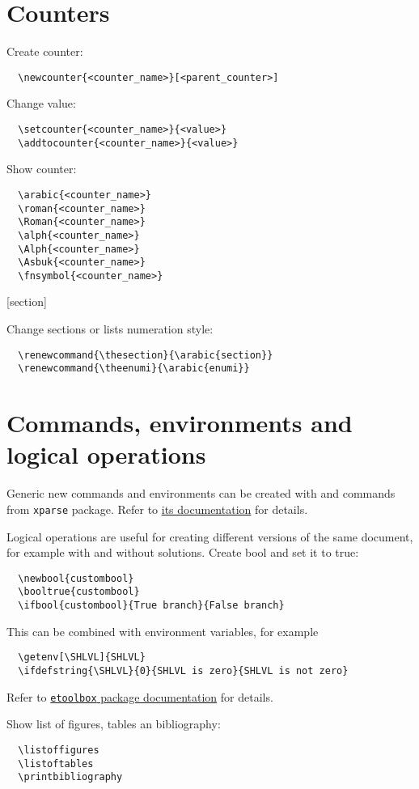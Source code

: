 \section{Counters}
Create counter:
\begin{verbatim}
  \newcounter{<counter_name>}[<parent_counter>]
\end{verbatim}
Change value:
\begin{verbatim}
  \setcounter{<counter_name>}{<value>}
  \addtocounter{<counter_name>}{<value>}
\end{verbatim}
Show counter:
\begin{verbatim}
  \arabic{<counter_name>}
  \roman{<counter_name>}
  \Roman{<counter_name>}
  \alph{<counter_name>}
  \Alph{<counter_name>}
  \Asbuk{<counter_name>}
  \fnsymbol{<counter_name>}
\end{verbatim}

[section]
\setcounter{customcounter}{1}
\begin{mdframed}[style=example]
\end{mdframed}

Change sections or lists numeration style:
\begin{verbatim}
  \renewcommand{\thesection}{\arabic{section}}
  \renewcommand{\theenumi}{\arabic{enumi}}
\end{verbatim}

\section{Commands, environments and logical operations}
Generic new commands and environments can be created with \texttt{\NewDocumentCommand} and \texttt{\NewDocumentEnvironment} commands from \texttt{xparse} package.
Refer to \href{https://ctan.org/pkg/xparse}{its documentation} for details.

Logical operations are useful for creating different versions of the same document, for example with and without solutions.
Create bool and set it to true:
\begin{verbatim}
  \newbool{custombool}
  \booltrue{custombool}
  \ifbool{custombool}{True branch}{False branch}
\end{verbatim}
This can be combined with environment variables, for example
\begin{verbatim}
  \getenv[\SHLVL]{SHLVL}
  \ifdefstring{\SHLVL}{0}{SHLVL is zero}{SHLVL is not zero}
\end{verbatim}
\begin{mdframed}[style=example]
\end{mdframed}

Refer to \href{https://ctan.org/pkg/etoolbox}{\texttt{etoolbox} package documentation} for details.

Show list of figures, tables an bibliography:
\begin{verbatim}
  \listoffigures
  \listoftables
  \printbibliography
\end{verbatim}

\listoffigures

\listoftables

\printbibliography


